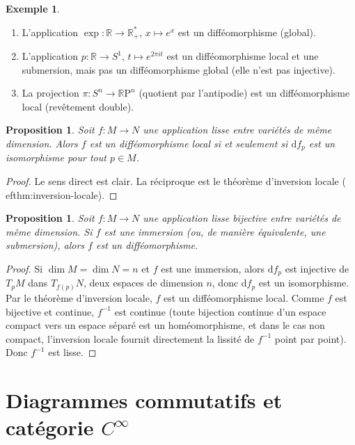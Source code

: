 \documentclass[12pt,a4paper,openany]{book}
\theoremstyle{definition}
\newtheorem{exemple}[definition]{Exemple}
\theoremstyle{plain}
\newtheorem{proposition}[definition]{Proposition}
\theoremstyle{remark}
\newcommand{\R}{\mathbb{R}}
\newcommand{\RP}{\mathbb{R}\mathrm{P}}
\newcommand{\dd}{\mathrm{d}}
\begin{document}
\begin{exemple}\label{ex:diffeo-local}
\begin{enumerate}[label=(\alph*)]
    \item L'application $\exp \colon \R \to \R^*_+$, $x \mapsto e^x$ est un
    difféomorphisme (global).
    \item L'application $p \colon \R \to S^1$, $t \mapsto e^{2\pi i t}$ est un
    difféomorphisme local et une submersion, mais pas un difféomorphisme global
    (elle n'est pas injective).
    \item La projection $\pi \colon S^n \to \RP^n$ (quotient par
    l'antipodie) est un difféomorphisme local (revêtement double).
\end{enumerate}
\end{exemple}

\begin{proposition}\label{prop:diffeo-local-caract}
Soit $f \colon M \to N$ une application lisse entre variétés de même
dimension. Alors $f$ est un difféomorphisme local si et seulement si $\dd f_p$
est un isomorphisme pour tout $p \in M$.
\end{proposition}

\begin{proof}
Le sens direct est clair. La réciproque est le théorème d'inversion locale
(
ef{thm:inversion-locale}).
\end{proof}

\begin{proposition}\label{prop:diffeo-global}
Soit $f \colon M \to N$ une application lisse bijective entre variétés de même
dimension. Si $f$ est une immersion (ou, de manière équivalente, une
submersion), alors $f$ est un difféomorphisme.
\end{proposition}

\begin{proof}
Si $\dim M = \dim N = n$ et $f$ est une immersion, alors $\dd f_p$ est
injective de $T_pM$ dans $T_{f(p)}N$, deux espaces de dimension $n$, donc
$\dd f_p$ est un isomorphisme. Par le théorème d'inversion locale, $f$ est un
difféomorphisme local. Comme $f$ est bijective et continue, $f^{-1}$ est
continue (toute bijection continue d'un espace compact vers un espace séparé
est un homéomorphisme, et dans le cas non compact, l'inversion locale fournit
directement la lissité de $f^{-1}$ point par point). Donc $f^{-1}$ est lisse.
\end{proof}


\section{Diagrammes commutatifs et catégorie \texorpdfstring{$C^\infty$}{C-infini}}
\label{sec:diagrammes}
\end{document}
